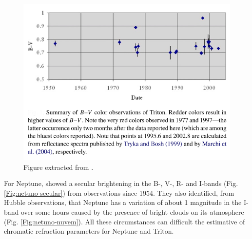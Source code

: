 \documentclass[12pt,a4paper]{report}
\begin{document}
\begin{figure}[h]
\centering
\includegraphics[scale=0.7]{Pascu.png}
\caption{Figure extracted from \cite{Pascu2006}. \label{Fig:Pascu}}
\end{figure}

For Neptune, \cite{Schmude2016} showed a secular brightening in the B-, V-, R- and I-bands (Fig. \ref{Fig:netuno-secular}) from observations since 1954. They also identified, from Hubble observations, that Neptune has a variation of about 1 magnitude in the I-band over some hours caused by the presence of bright clouds on its atmosphere (Fig. \ref{Fig:netuno-nuvem}). All these circumstances can difficult the estimative of chromatic refraction parameters for Neptune and Triton.
\end{document}
